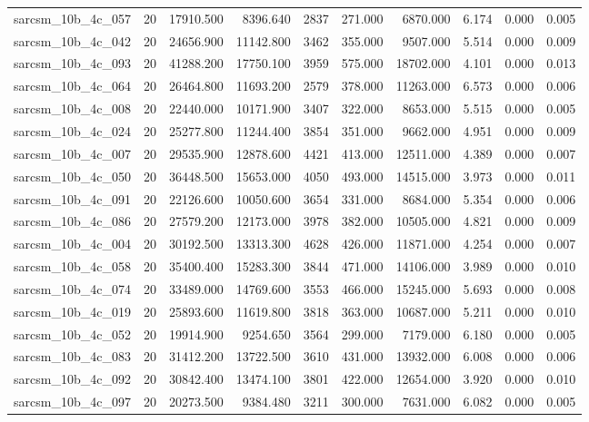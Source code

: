 \begin{tabular}{lrrrrrrrrr}
sarcsm\_10b\_4c\_057 & 20 & 17910.500 & 8396.640 & 2837 & 271.000 & 6870.000 & 6.174 & 0.000 & 0.005 \\
sarcsm\_10b\_4c\_042 & 20 & 24656.900 & 11142.800 & 3462 & 355.000 & 9507.000 & 5.514 & 0.000 & 0.009 \\
sarcsm\_10b\_4c\_093 & 20 & 41288.200 & 17750.100 & 3959 & 575.000 & 18702.000 & 4.101 & 0.000 & 0.013 \\
sarcsm\_10b\_4c\_064 & 20 & 26464.800 & 11693.200 & 2579 & 378.000 & 11263.000 & 6.573 & 0.000 & 0.006 \\
sarcsm\_10b\_4c\_008 & 20 & 22440.000 & 10171.900 & 3407 & 322.000 & 8653.000 & 5.515 & 0.000 & 0.005 \\
sarcsm\_10b\_4c\_024 & 20 & 25277.800 & 11244.400 & 3854 & 351.000 & 9662.000 & 4.951 & 0.000 & 0.009 \\
sarcsm\_10b\_4c\_007 & 20 & 29535.900 & 12878.600 & 4421 & 413.000 & 12511.000 & 4.389 & 0.000 & 0.007 \\
sarcsm\_10b\_4c\_050 & 20 & 36448.500 & 15653.000 & 4050 & 493.000 & 14515.000 & 3.973 & 0.000 & 0.011 \\
sarcsm\_10b\_4c\_091 & 20 & 22126.600 & 10050.600 & 3654 & 331.000 & 8684.000 & 5.354 & 0.000 & 0.006 \\
sarcsm\_10b\_4c\_086 & 20 & 27579.200 & 12173.000 & 3978 & 382.000 & 10505.000 & 4.821 & 0.000 & 0.009 \\
sarcsm\_10b\_4c\_004 & 20 & 30192.500 & 13313.300 & 4628 & 426.000 & 11871.000 & 4.254 & 0.000 & 0.007 \\
sarcsm\_10b\_4c\_058 & 20 & 35400.400 & 15283.300 & 3844 & 471.000 & 14106.000 & 3.989 & 0.000 & 0.010 \\
sarcsm\_10b\_4c\_074 & 20 & 33489.000 & 14769.600 & 3553 & 466.000 & 15245.000 & 5.693 & 0.000 & 0.008 \\
sarcsm\_10b\_4c\_019 & 20 & 25893.600 & 11619.800 & 3818 & 363.000 & 10687.000 & 5.211 & 0.000 & 0.010 \\
sarcsm\_10b\_4c\_052 & 20 & 19914.900 & 9254.650 & 3564 & 299.000 & 7179.000 & 6.180 & 0.000 & 0.005 \\
sarcsm\_10b\_4c\_083 & 20 & 31412.200 & 13722.500 & 3610 & 431.000 & 13932.000 & 6.008 & 0.000 & 0.006 \\
sarcsm\_10b\_4c\_092 & 20 & 30842.400 & 13474.100 & 3801 & 422.000 & 12654.000 & 3.920 & 0.000 & 0.010 \\
sarcsm\_10b\_4c\_097 & 20 & 20273.500 & 9384.480 & 3211 & 300.000 & 7631.000 & 6.082 & 0.000 & 0.005 \\

\end{tabular}
